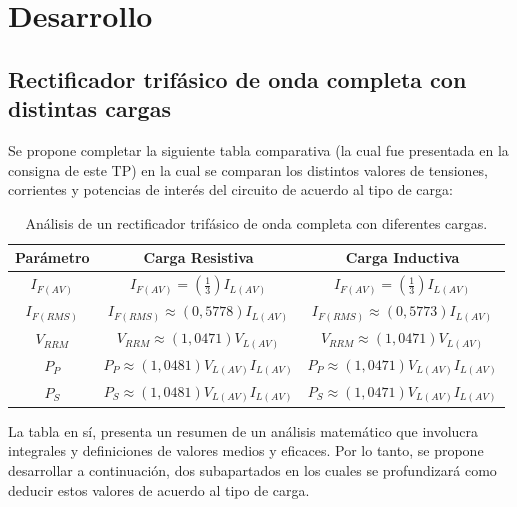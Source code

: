 \documentclass[12pt,a4paper]{article}
\begin{document}
\section{Desarrollo}
\subsection{Rectificador trifásico de onda completa con distintas cargas}
Se propone completar la siguiente tabla comparativa (la cual fue presentada en la consigna de este TP) en la cual se comparan los distintos valores de tensiones, corrientes y potencias de interés del circuito de acuerdo al tipo de carga:

\begin{table}[H]
    \centering
    \begin{tabular}{| c | c | c |} \hline
        \textbf{Parámetro} & \textbf{Carga Resistiva} & \textbf{Carga Inductiva} \\ \hline
        \multirow{2}{*}{$I_{F(AV)}$} & \multirow{2}{5cm}{$I_{F(AV)} = \left(\frac{1}{3}\right) I_{L(AV)}$} & \multirow{2}{5cm}{$I_{F(AV)} = \left(\frac{1}{3}\right) I_{L(AV)}$} \\ & & \\ \hline
        \multirow{2}{*}{$I_{F(RMS)}$} & \multirow{2}{5cm}{$I_{F(RMS)} \approx (0,5778) I_{L(AV)}$} & \multirow{2}{5cm}{$I_{F(RMS)} \approx (0,5773) I_{L(AV)}$} \\ & & \\ \hline
        \multirow{2}{*}{$V_{RRM}$} & \multirow{2}{5cm}{$V_{RRM} \approx (1,0471) V_{L(AV)}$} & \multirow{2}{5cm}{$V_{RRM} \approx (1,0471)V_{L(AV)}$} \\ & & \\ \hline
        \multirow{2}{*}{$P_{P}$} & \multirow{2}{5cm}{$P_{P} \approx (1,0481) V_{L(AV)} I_{L(AV)} $} & \multirow{2}{5cm}{$P_{P} \approx (1,0471) V_{L(AV)} I_{L(AV)} $} \\ & & \\ \hline
        \multirow{2}{*}{$P_{S}$} & \multirow{2}{5cm}{$P_{S} \approx (1,0481) V_{L(AV)} I_{L(AV)}$} & \multirow{2}{5cm}{$P_{S} \approx (1,0471) V_{L(AV)} I_{L(AV)} $} \\ & & \\ \hline
    \end{tabular}
    \caption{Análisis de un rectificador trifásico de onda completa con diferentes cargas.}
    \label{tab:tb_1}
\end{table}

La tabla en sí, presenta un resumen de un análisis matemático que involucra integrales y definiciones de valores medios y eficaces. Por lo tanto, se propone desarrollar a continuación, dos subapartados en los cuales se profundizará como deducir estos valores de acuerdo al tipo de carga.
\end{document}
